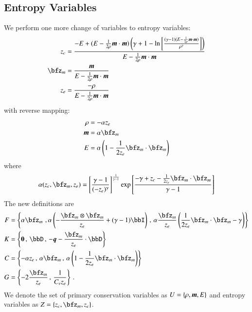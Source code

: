 \documentclass[preprint,12pt]{elsarticle}
\begin{document}
\subsection{Entropy Variables}
We perform one more change of variables to entropy variables:
\begin{align*}
z_c&=\frac{-E+(E-\frac{1}{2\rho}\bfm\cdot\bfm)\LRp{\gamma+1-\ln\LRs{\frac{(\gamma-1)(E-\frac{1}{2\rho}\bfm\cdot\bfm)}{\rho^\gamma}}}}
{E-\frac{1}{2\rho}\bfm\cdot\bfm}\\
\bfz_m&=\frac{\bfm}{E-\frac{1}{2\rho}\bfm\cdot\bfm}\\
z_e&=\frac{-\rho}{E-\frac{1}{2\rho}\bfm\cdot\bfm}\\
\end{align*}
with reverse mapping:
\begin{align*}
\rho&=-\alpha z_e\\
\bfm&=\alpha\bfz_m\\
E&=\alpha\LRp{1-\frac{1}{2z_e}\bfz_m\cdot\bfz_m}\\
\end{align*}
where 
\[
\alpha(z_c,\bfz_m,z_e)=\LRs{\frac{\gamma-1}{(-z_e)^\gamma}}^{\frac{1}{\gamma-1}}\exp\LRs{\frac{-\gamma+z_c-\frac{1}{2z_e}\bfz_m\cdot\bfz_m}{\gamma-1}}
\]
The new definitions are
\begin{align*}
F&=\LRc{\alpha\bfz_m\,\,,
\alpha\LRp{-\frac{\bfz_m\otimes\bfz_m}{z_e}+(\gamma-1)\bbI}\,,\,
\alpha\frac{\bfz_m}{z_e}\LRp{\frac{1}{2z_e}\bfz_m\cdot\bfz_m-\gamma}}\\
K&=\LRc{\boldsymbol 0\,,\,
\bbD\,,\,
-\bfq-\frac{\bfz_m}{z_e}\cdot\bbD}\\
C&=\LRc{-\alpha z_e\,,\,
\alpha\bfz_m\,,\,
\alpha\LRp{1-\frac{1}{2z_e}\bfz_m\cdot\bfz_m}}\\
G&=\LRc{-2\frac{\bfz_m}{z_e}\,,\,
\frac{1}{C_vz_e}}\,.
\end{align*}
We denote the set of primary conservation variables as $U=\left\{ \rho,\boldsymbol m,E \right\}$ and entropy variables as $Z=\LRc{z_c,\bfz_m,z_e}$.

%                                                                                                                  
%                                                                                                                  
%   
\end{document}

